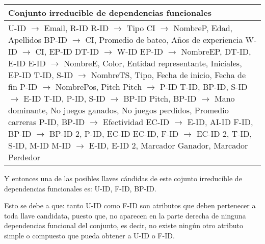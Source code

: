 \documentclass{report}
\begin{document}
    \begin{tabularx}{\textwidth}{|X|}
        \toprule
        \hfil \textbf{Conjunto irreducible de dependencias funcionales} \\
        \midrule
        U-ID $\rightarrow$ Email, R-ID \newline 
        R-ID $\rightarrow$ Tipo \newline 
        CI $\rightarrow$ NombreP, Edad, Apellidos \newline 
        BP-ID $\rightarrow$ CI, Promedio de bateo, Años de experiencia \newline 
        W-ID $\rightarrow$ CI, EP-ID \newline 
        DT-ID $\rightarrow$ W-ID \newline 
        EP-ID $\rightarrow$ NombreEP, DT-ID, E-ID \newline 
        E-ID $\rightarrow$ NombreE, Color, Entidad representante, Iniciales, EP-ID \newline 
        T-ID, S-ID $\rightarrow$ NombreTS, Tipo, Fecha de inicio, Fecha de fin \newline 
        P-ID $\rightarrow$ NombrePos, Pitch \newline 
        Pitch $\rightarrow$ P-ID \newline 
        T-ID, BP-ID, S-ID $\rightarrow$ E-ID \newline 
        T-ID, P-ID, S-ID $\rightarrow$ BP-ID \newline 
        Pitch, BP-ID $\rightarrow$ Mano dominante, No juegos ganados, No juegos perdidos, Promedio carreras \newline 
        P-ID, BP-ID $\rightarrow$ Efectividad \newline 
        EC-ID $\rightarrow$ E-ID, AI-ID \newline 
        F-ID, BP-ID $\rightarrow$ BP-ID 2, P-ID, EC-ID \newline 
        EC-ID, F-ID $\rightarrow$ EC-ID 2, T-ID, S-ID, M-ID \newline 
        M-ID $\rightarrow$ E-ID, E-ID 2, Marcador Ganador, Marcador Perdedor \\ 
        \bottomrule
    \end{tabularx}

    Y entonces una de las posibles llaves cándidas de este cojunto irreducible de dependencias funcionales es: U-ID, 
    F-ID, BP-ID. \newline

    Esto se debe a que: tanto U-ID como F-ID son atributos que deben pertenecer a toda llave candidata, puesto que,
    no aparecen en la parte derecha de ninguna dependencias funcional del conjunto, es decir, no existe ningún
    otro atributo simple o compuesto que pueda obtener a U-ID o F-ID. \newline
    
\end{document}
